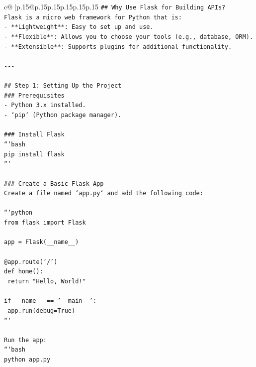 \documentclass{article}
\begin{document}
{\begin{supertabular}{c@{$\;$}|p{.15\linewidth}@{}p{.15\linewidth}p{.15\linewidth}p{.15\linewidth}p{.15\linewidth}p{.15\linewidth}}
{{{\texttt{\#\# Why Use Flask for Building APIs?} \\
\texttt{Flask is a micro web framework for Python that is:} \\
\texttt{{-} **Lightweight**: Easy to set up and use.} \\
\texttt{{-} **Flexible**: Allows you to choose your tools (e.g., database, ORM).} \\
\texttt{{-} **Extensible**: Supports plugins for additional functionality.} \\
\\ 
\texttt{{-}{-}{-}} \\
\\ 
\texttt{\#\# Step 1: Setting Up the Project} \\
\texttt{\#\#\# Prerequisites} \\
\texttt{{-} Python 3.x installed.} \\
\texttt{{-} `pip` (Python package manager).} \\
\\ 
\texttt{\#\#\# Install Flask} \\
\texttt{```bash} \\
\texttt{pip install flask} \\
\texttt{```} \\
\\ 
\texttt{\#\#\# Create a Basic Flask App} \\
\texttt{Create a file named `app.py` and add the following code:} \\
\\ 
\texttt{```python} \\
\texttt{from flask import Flask} \\
\\ 
\texttt{app = Flask(\_\_name\_\_)} \\
\\ 
\texttt{@app.route('/')} \\
\texttt{def home():} \\
\texttt{    return "Hello, World!"} \\
\\ 
\texttt{if \_\_name\_\_ == '\_\_main\_\_':} \\
\texttt{    app.run(debug=True)} \\
\texttt{```} \\
\\ 
\texttt{Run the app:} \\
\texttt{```bash} \\
\texttt{python app.py} \\
}}}
\end{supertabular}}
\end{document}
